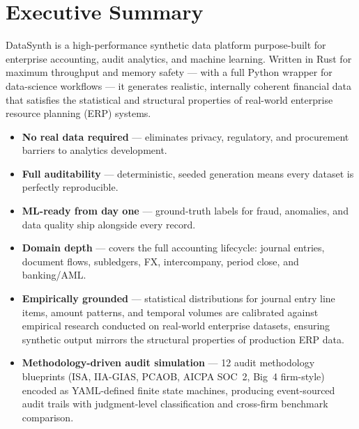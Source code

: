 \documentclass[11pt,a4paper]{article}
\begin{document}
\tableofcontents
\newpage

\section{Executive Summary}

DataSynth is a high-performance synthetic data platform purpose-built for
enterprise accounting, audit analytics, and machine learning. Written in Rust
for maximum throughput and memory safety --- with a full Python wrapper for
data-science workflows --- it generates realistic, internally coherent
financial data that satisfies the statistical and structural properties of
real-world enterprise resource planning (ERP) systems.

\begin{tcolorbox}[keybox={Why DataSynth?}]
\begin{itemize}[leftmargin=1.2em, itemsep=3pt]
  \item \textbf{No real data required} --- eliminates privacy, regulatory, and
        procurement barriers to analytics development.
  \item \textbf{Full auditability} --- deterministic, seeded generation means
        every dataset is perfectly reproducible.
  \item \textbf{ML-ready from day one} --- ground-truth labels for fraud,
        anomalies, and data quality ship alongside every record.
  \item \textbf{Domain depth} --- covers the full accounting lifecycle:
        journal entries, document flows, subledgers, FX, intercompany,
        period close, and banking/AML.
  \item \textbf{Empirically grounded} --- statistical distributions for
        journal entry line items, amount patterns, and temporal volumes are
        calibrated against empirical research conducted on real-world
        enterprise datasets, ensuring synthetic output mirrors the
        structural properties of production ERP data.
  \item \textbf{Methodology-driven audit simulation} --- 12 audit methodology
        blueprints (ISA, IIA-GIAS, PCAOB, AICPA SOC~2, Big~4 firm-style)
        encoded as YAML-defined finite state machines, producing
        event-sourced audit trails with judgment-level classification
        and cross-firm benchmark comparison.
\end{itemize}
\end{tcolorbox}
\end{document}
